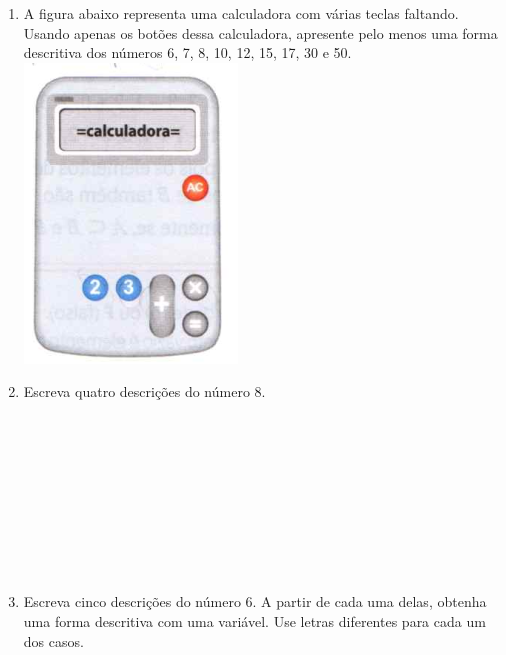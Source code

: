 \documentclass[a4paper,14pt]{article}
\begin{document}
\begin{multicols}{2}
\begin{enumerate}
			\item A figura abaixo representa uma calculadora com várias teclas faltando. Usando apenas os botões dessa calculadora, apresente pelo menos uma forma descritiva dos números 6, 7, 8, 10, 12, 15, 17, 30 e 50. \\
			\includegraphics[width=0.7\linewidth]{6FMA05_imagens/imagem1} \newpage
			\item Escreva quatro descrições do número 8. \\\\\\\\\\\\\\\\\\\
			\item Escreva cinco descrições do número 6. A partir de cada uma delas, obtenha uma forma descritiva com uma variável. Use letras diferentes para cada um dos casos. \\\\\\\\\\\\\\\\\\\

\end{enumerate}
\end{multicols}
\end{document}
